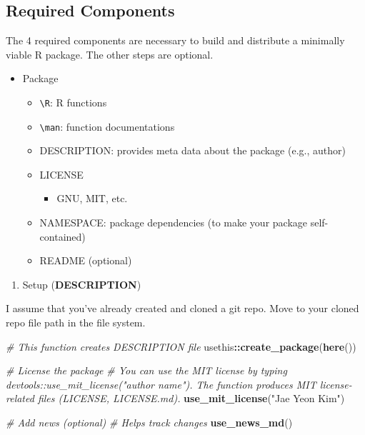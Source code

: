 \documentclass[
]{book}
\newenvironment{Shaded}{\begin{snugshade}}{\end{snugshade}}
\newcommand{\CommentTok}[1]{\textcolor[rgb]{0.56,0.35,0.01}{\textit{#1}}}
\newcommand{\KeywordTok}[1]{\textcolor[rgb]{0.13,0.29,0.53}{\textbf{#1}}}
\newcommand{\NormalTok}[1]{#1}
\newcommand{\OperatorTok}[1]{\textcolor[rgb]{0.81,0.36,0.00}{\textbf{#1}}}
\newcommand{\StringTok}[1]{\textcolor[rgb]{0.31,0.60,0.02}{#1}}
\providecommand{\tightlist}{%
  \setlength{\itemsep}{0pt}\setlength{\parskip}{0pt}}
\begin{document}
\hypertarget{required-components}{%
\subsection{Required Components}\label{required-components}}

The 4 required components are necessary to build and distribute a minimally viable R package. The other steps are optional.

\begin{itemize}
\tightlist
\item
  Package

  \begin{itemize}
  \tightlist
  \item
    \texttt{\textbackslash{}R}: R functions
  \item
    \texttt{\textbackslash{}man}: function documentations
  \item
    DESCRIPTION: provides meta data about the package (e.g., author)
  \item
    LICENSE

    \begin{itemize}
    \tightlist
    \item
      GNU, MIT, etc.
    \end{itemize}
  \item
    NAMESPACE: package dependencies (to make your package self-contained)
  \item
    README (optional)
  \end{itemize}
\end{itemize}

\begin{enumerate}
\def\labelenumi{\arabic{enumi}.}
\tightlist
\item
  Setup (\textbf{DESCRIPTION})
\end{enumerate}

I assume that you've already created and cloned a git repo. Move to your cloned repo file path in the file system.

\begin{Shaded}
\begin{Highlighting}[]
\CommentTok{\# This function creates DESCRIPTION file }
\NormalTok{usethis}\OperatorTok{::}\KeywordTok{create\_package}\NormalTok{(}\KeywordTok{here}\NormalTok{())}

\CommentTok{\# License the package }
\CommentTok{\# You can use the MIT license by typing devtools::use\_mit\_license("author name"). The function produces MIT license{-}related files (LICENSE, LICENSE.md).}
\KeywordTok{use\_mit\_license}\NormalTok{(}\StringTok{"Jae Yeon Kim"}\NormalTok{)}

\CommentTok{\# Add news (optional) }
\CommentTok{\# Helps track changes }
\KeywordTok{use\_news\_md}\NormalTok{() }
\end{Highlighting}
\end{Shaded}
\end{document}
